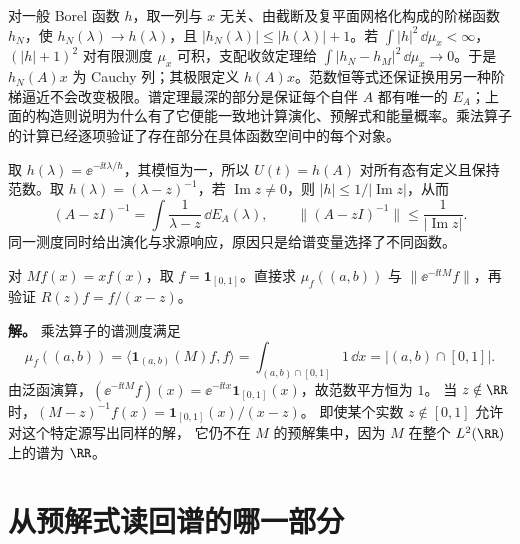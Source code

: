 对一般 Borel 函数 \(h\)，取一列与 \(x\) 无关、由截断及复平面网格化构成的阶梯函数 \(h_N\)，使 \(h_N(\lambda)\to h(\lambda)\)，且 \(|h_N(\lambda)|\le|h(\lambda)|+1\)。若 \(\int|h|^2\,\dd\mu_x<\infty\)，\((|h|+1)^2\) 对有限测度 \(\mu_x\) 可积，支配收敛定理给 \(\int|h_N-h_M|^2\,\dd\mu_x\to0\)。于是 \(h_N(A)x\) 为 Cauchy 列；其极限定义 \(h(A)x\)。范数恒等式还保证换用另一种阶梯逼近不会改变极限。谱定理最深的部分是保证每个自伴 \(A\) 都有唯一的 \(E_A\)；上面的构造则说明为什么有了它便能一致地计算演化、预解式和能量概率。乘法算子的计算已经逐项验证了存在部分在具体函数空间中的每个对象。

取 \(h(\lambda)=\ee^{-\ii t\lambda/\hbar}\)，其模恒为一，所以 \(U(t)=h(A)\) 对所有态有定义且保持范数。取 \(h(\lambda)=(\lambda-z)^{-1}\)，若 \(\operatorname{Im}z\ne0\)，则 \(|h|\le1/|\operatorname{Im}z|\)，从而
\[
(A-zI)^{-1}=\int\frac{1}{\lambda-z}\,\dd E_A(\lambda),
\qquad \|(A-zI)^{-1}\|\le\frac1{|\operatorname{Im}z|}.
\]
同一测度同时给出演化与求源响应，原因只是给谱变量选择了不同函数。


\par
\begin{workedexample}
对 \(M f(x)=xf(x)\)，取 \(f=\mathbf1_{[0,1]}\)。直接求 \(\mu_f((a,b))\) 与 \(\|\ee^{-\ii tM}f\|\)，再验证 \(R(z)f=f/(x-z)\)。


\textbf{解。} 乘法算子的谱测度满足
\[
\mu_f((a,b))=\langle \mathbf1_{(a,b)}(M)f,f\rangle=\int_{(a,b)\cap[0,1]}1\,\dd x=| (a,b)\cap[0,1] |.
\]
由泛函演算，\((\ee^{-\ii tM}f)(x)=\ee^{-\ii tx}\mathbf1_{[0,1]}(x)\)，故范数平方恒为 \(1\)。
当 \(z\notin\RR\) 时，\((M-z)^{-1}f(x)=\mathbf1_{[0,1]}(x)/(x-z)\)。
即使某个实数 \(z\notin[0,1]\) 允许对这个特定源写出同样的解，
它仍不在 \(M\) 的预解集中，因为 \(M\) 在整个 \(L^2(\RR)\) 上的谱为 \(\RR\)。
\end{workedexample}
\par
\section{从预解式读回谱的哪一部分}


